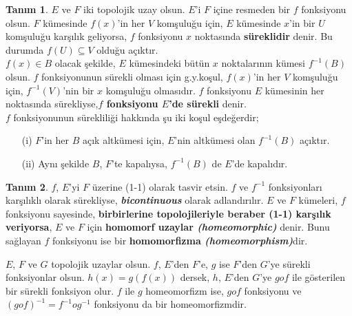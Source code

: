 \documentclass[11pt]{article}
\theoremstyle{plain}
\theoremstyle{definition}
\newtheorem{definition}{Tanım}
\theoremstyle{remark}
\numberwithin{equation}{section}
\renewcommand{\%}{{\small \%}}
\begin{document}
\begin{definition}
$E$ ve $F$ iki topolojik uzay olsun. $E$'i $F$ içine resmeden bir $f$ fonksiyonu olsun. $F$ kümesinde $f(x)$'in her $V$ komşuluğu için, $E$ kümesinde $x$'in bir $U$ komşuluğu karşılık geliyorsa, $f$ fonksiyonu $x$ noktasında \textbf{süreklidir} denir. Bu durumda $f(U)\subseteq V$ olduğu açıktır.\\
 $f(x)\in B$ olacak şekilde, $E$ kümesindeki bütün $x$ noktalarının kümesi $f^{-1}\left(B\right)$ olsun. $f$ fonksiyonunun sürekli olması için g.y.koşul, $f(x)$'in her $V$ komşuluğu için, $f^{-1}\left(V\right)$'nin bir $x$ komşuluğu olmasıdır. $f$ fonksiyonu $E$ kümesinin her noktasında sürekliyse,\textbf {$f$ fonksiyonu $E$'de sürekli} denir.\\[3pt]
$f$ fonksiyonunun sürekliliği hakkında şu iki koşul eşdeğerdir;
\begin{itemize}
\item[(i)] $F$'in her $B$ açık altkümesi için, $E$'nin altkümesi olan $f^{-1}\left(B\right)$ açıktır.
\item [(ii)]Aynı şekilde $B$, $F$'te kapalıysa, $f^{-1}\left(B\right)$ de $E$'de kapalıdır.
\end{itemize}
\end{definition}

\begin{definition}
$f$, $E$'yi $F$ üzerine (1-1) olarak tasvir etsin. $f$ ve $f^{-1}$ fonksiyonları karşılıklı olarak sürekliyse, \textbf{\emph{bicontinuous}} olarak adlandırılır. $E$ ve $F$ kümeleri, $f$ fonksiyonu sayesinde, \textbf{birbirlerine topolojileriyle beraber (1-1) karşılık veriyorsa}, $E$ ve $F$ için \textbf{homomorf uzaylar\emph{ (homeomorphic)}} denir. Bunu sağlayan $f$ fonksiyonu ise bir \textbf{homomorfizma\emph{ (homeomorphism)}}dir.
\end{definition}
$E$, $F$ ve $G$ topolojik uzaylar olsun. $f$, $E$'den $F$'e, $g$ ise $F$'den $G$'ye sürekli fonksiyonlar olsun. $h(x)=g\left(f(x)\right)$ dersek, $h$, $E$'den $G$'ye $gof$ ile gösterilen bir sürekli fonksiyon olur. $f$ ile $g$ homeomorfizm ise, $gof$ fonksiyonu ve $\left(gof\right)^{-1}=f^{-1}og^{-1}$ fonksiyonu da bir homeomorfizmdir.
\newpage
\end{document}
